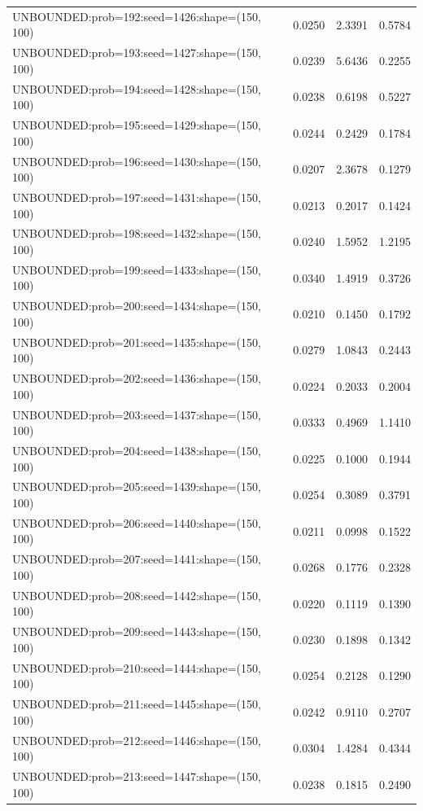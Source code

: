 \begin{longtable}{lccc}
UNBOUNDED:prob=192:seed=1426:shape=(150, 100) &   0.0250 &  2.3391 &  0.5784 \\
UNBOUNDED:prob=193:seed=1427:shape=(150, 100) &   0.0239 &  5.6436 &  0.2255 \\
UNBOUNDED:prob=194:seed=1428:shape=(150, 100) &   0.0238 &  0.6198 &  0.5227 \\
UNBOUNDED:prob=195:seed=1429:shape=(150, 100) &   0.0244 &  0.2429 &  0.1784 \\
UNBOUNDED:prob=196:seed=1430:shape=(150, 100) &   0.0207 &  2.3678 &  0.1279 \\
UNBOUNDED:prob=197:seed=1431:shape=(150, 100) &   0.0213 &  0.2017 &  0.1424 \\
UNBOUNDED:prob=198:seed=1432:shape=(150, 100) &   0.0240 &  1.5952 &  1.2195 \\
UNBOUNDED:prob=199:seed=1433:shape=(150, 100) &   0.0340 &  1.4919 &  0.3726 \\
UNBOUNDED:prob=200:seed=1434:shape=(150, 100) &   0.0210 &  0.1450 &  0.1792 \\
UNBOUNDED:prob=201:seed=1435:shape=(150, 100) &   0.0279 &  1.0843 &  0.2443 \\
UNBOUNDED:prob=202:seed=1436:shape=(150, 100) &   0.0224 &  0.2033 &  0.2004 \\
UNBOUNDED:prob=203:seed=1437:shape=(150, 100) &   0.0333 &  0.4969 &  1.1410 \\
UNBOUNDED:prob=204:seed=1438:shape=(150, 100) &   0.0225 &  0.1000 &  0.1944 \\
UNBOUNDED:prob=205:seed=1439:shape=(150, 100) &   0.0254 &  0.3089 &  0.3791 \\
UNBOUNDED:prob=206:seed=1440:shape=(150, 100) &   0.0211 &  0.0998 &  0.1522 \\
UNBOUNDED:prob=207:seed=1441:shape=(150, 100) &   0.0268 &  0.1776 &  0.2328 \\
UNBOUNDED:prob=208:seed=1442:shape=(150, 100) &   0.0220 &  0.1119 &  0.1390 \\
UNBOUNDED:prob=209:seed=1443:shape=(150, 100) &   0.0230 &  0.1898 &  0.1342 \\
UNBOUNDED:prob=210:seed=1444:shape=(150, 100) &   0.0254 &  0.2128 &  0.1290 \\
UNBOUNDED:prob=211:seed=1445:shape=(150, 100) &   0.0242 &  0.9110 &  0.2707 \\
UNBOUNDED:prob=212:seed=1446:shape=(150, 100) &   0.0304 &  1.4284 &  0.4344 \\
UNBOUNDED:prob=213:seed=1447:shape=(150, 100) &   0.0238 &  0.1815 &  0.2490 \\

\end{longtable}
